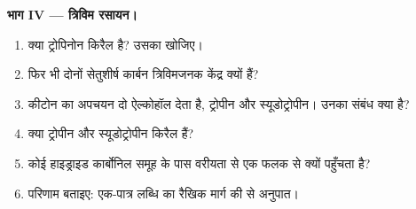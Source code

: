 \begin{problem}
\medskip\noindent\textbf{भाग IV --- त्रिविम रसायन।}
\begin{enumerate}[resume]
  \item क्या ट्रोपिनोन किरैल है? उसका  खोजिए।
  \item फिर भी दोनों सेतुशीर्ष कार्बन त्रिविमजनक केंद्र क्यों हैं?
  \item कीटोन का अपचयन दो ऐल्कोहॉल देता है, ट्रोपीन और स्यूडोट्रोपीन। उनका
        संबंध क्या है?
  \item क्या ट्रोपीन और स्यूडोट्रोपीन किरैल हैं?
  \item कोई हाइड्राइड कार्बोनिल समूह के पास वरीयता से एक फलक से क्यों पहुँचता है?
  \item परिणाम बताइए: एक-पात्र लब्धि का रैखिक मार्ग की
         से अनुपात।
\end{enumerate}
\end{problem}
